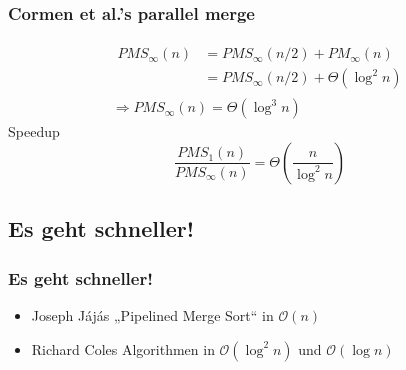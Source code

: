 \begin{frame}
    \frametitle{Cormen et al.'s parallel merge}
    \begin{equation}
        \begin{gathered}
            \begin{split}
                PMS_\infty(n) &= PMS_\infty(n/2) + PM_\infty(n) \\
                &= PMS_\infty(n/2) + \Theta(\log^2 n)
            \end{split}
            \\
            \Rightarrow PMS_\infty(n) = \Theta(\log^3 n)
        \end{gathered}
    \end{equation}
    \pause
    Speedup
    \begin{equation}
        \frac{PMS_1(n)}{PMS_\infty(n)} = \Theta \left( \frac{n}{\log^2 n} \right)
    \end{equation}
\end{frame}

\subsection{Es geht schneller!}
\begin{frame}
    \frametitle{Es geht schneller!}
    \begin{itemize}
        \item Joseph J\'aj\'as „Pipelined Merge Sort“ \cite[S.163]{jaja} in
            $\mathcal{O}(n)$
        \item Richard Coles Algorithmen \cite[Kapitel 10]{reif} in
            $\mathcal{O}(\log^2 n)$ und $\mathcal{O}(\log n)$
    \end{itemize}
\end{frame}
